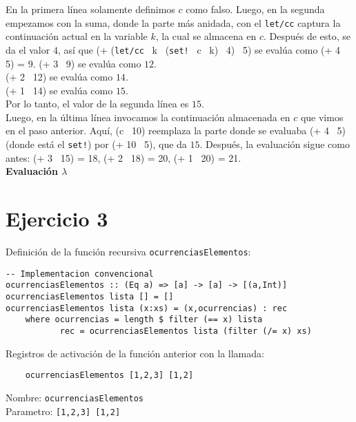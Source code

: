 \documentclass{article}
\begin{document}
En la primera línea solamente definimos $c$ como falso. Luego, en la segunda empezamos con la suma, donde la parte más anidada, con el \texttt{let/cc} captura la continuación actual en la variable $k$, la cual se almacena en $c$. Después de esto, se da el valor $4$, así que (+ (\texttt{let/cc} \, k \, (\texttt{set!} \, c \, k) \, 4) \, 5) se evalúa como  (+ 4 \, 5) = 9.
(+ 3 \, 9) se evalúa como $12$.\\
(+ 2 \, 12) se evalúa como $14$.\\
(+ 1 \, 14) se evalúa como $15$.\\
Por lo tanto, el valor de la segunda línea es $15$.\\
Luego, en la última línea invocamos la continuación almacenada en $c$ que vimos en el paso anterior. Aquí, (c \, 10)  reemplaza la parte donde se evaluaba (+ 4 \, 5) (donde está el \texttt{set!}) por (+ 10 \, 5), que da $15$. Después, la evaluación sigue como antes:
(+ 3 \, 15) = 18, \quad (+ 2 \, 18) = 20, \quad {} \quad (+ 1 \, 20) = 21.\\

\textbf{Evaluación $\lambda$}\\

\section*{Ejercicio 3}

Definición de la función recursiva \texttt{ocurrenciasElementos}:

\begin{lstlisting}
-- Implementacion convencional
ocurrenciasElementos :: (Eq a) => [a] -> [a] -> [(a,Int)]
ocurrenciasElementos lista [] = []
ocurrenciasElementos lista (x:xs) = (x,ocurrencias) : rec
    where ocurrencias = length $ filter (== x) lista
           rec = ocurrenciasElementos lista (filter (/= x) xs)
\end{lstlisting}

Registros de activación de la función anterior con la llamada:
\begin{verbatim}
    ocurrenciasElementos [1,2,3] [1,2]
\end{verbatim}

Nombre: \texttt{ocurrenciasElementos}\\
Parametro: \texttt{[1,2,3] [1,2]}\\
\end{document}
